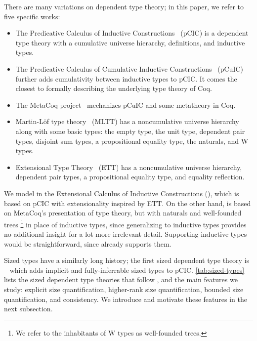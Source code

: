 \documentclass[acmsmall,review,anonymous]{acmart}\settopmatter{printfolios=true,printccs=false,printacmref=false}
\begin{document}
There are many variations on dependent type theory;
in this paper, we refer to five specific works:

\begin{itemize}
  \item The Predicative Calculus of Inductive Constructions~\citep{pCIC} (pCIC)
    is a dependent type theory with a cumulative universe hierarchy,
    definitions, and inductive types.
  \item The Predicative Calculus of Cumulative Inductive Constructions~\citep{pCuIC} (pCuIC)
    further adds cumulativity between inductive types to pCIC.
    It comes the closest to formally describing the underlying type theory of Coq.
  \item The MetaCoq project~\citep{MetaCoq} mechanizes pCuIC
    and some metatheory in Coq.
  \item Martin-L\"of type theory~\citep{MLTT} (MLTT) has a noncumulative universe hierarchy
    along with some basic types:
    the empty type, the unit type, dependent pair types, disjoint sum types,
    a propositional equality type, the naturals, and W types.
  \item Extensional Type Theory~\citep{CICE} (ETT) has a noncumulative universe hierarchy,
    dependent pair types, a propositional equality type,
    and equality reflection.
\end{itemize}

We model \lang in the Extensional Calculus of Inductive Constructions (\CICE),
which is based on pCIC with extensionality inspired by ETT.
On the other hand, \lang is based on MetaCoq's presentation of type theory,
but with naturals and well-founded trees%
\footnote{We refer to the inhabitants of W types as well-founded trees.}
in place of inductive types,
since generalizing to inductive types provides no additional insight for a lot
more irrelevant detail.
Supporting inductive types would be straightforward, since \CICE already supports them.

Sized types have a similarly long history;
the first sized dependent type theory is \CIChat~\citep{CIC-hat}
which adds implicit and fully-inferrable sized types to pCIC.
\cref{tab:sized-types} lists the sized dependent type theories that follow \CIChat,
and the main features we study:
explicit size quantification,
higher-rank size quantification,
bounded size quantification,
and consistency.
We introduce and motivate these features in the next subsection.
\end{document}
